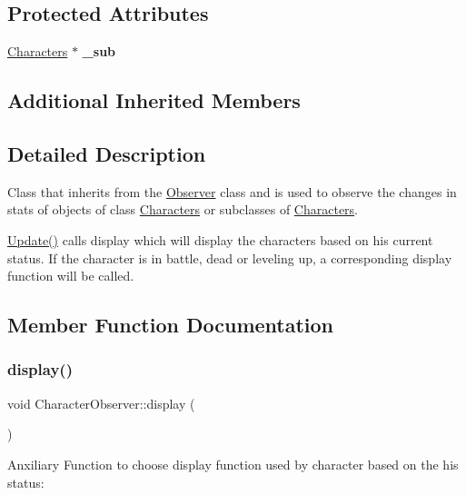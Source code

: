 \subsection*{Protected Attributes}
\begin{DoxyCompactItemize}
\item 
\hypertarget{class_character_observer_aa852c1035c283d001b867ca8093ca714}{}\label{class_character_observer_aa852c1035c283d001b867ca8093ca714} 
\hyperlink{class_characters}{Characters} $\ast$ {\bfseries \+\_\+sub}
\end{DoxyCompactItemize}
\subsection*{Additional Inherited Members}


\subsection{Detailed Description}
Class that inherits from the \hyperlink{class_observer}{Observer} class and is used to observe the changes in stats of objects of class \hyperlink{class_characters}{Characters} or subclasses of \hyperlink{class_characters}{Characters}.

\hyperlink{class_character_observer_a398d6d784065c7ed36c928d44a574630}{Update()} calls display which will display the character\textquotesingle{}s based on his current status. If the character is in battle, dead or leveling up, a corresponding display function will be called. 

\subsection{Member Function Documentation}
\hypertarget{class_character_observer_af255a3fd431b55de8dd2ab9a639e546b}{}\label{class_character_observer_af255a3fd431b55de8dd2ab9a639e546b} 
\subsubsection{\texorpdfstring{display()}{display()}}
{\footnotesize\ttfamily void Character\+Observer\+::display (\begin{DoxyParamCaption}{ }\end{DoxyParamCaption})}

Anxiliary Function to choose display function used by character based on the his status\+:

